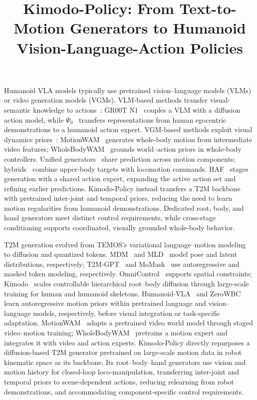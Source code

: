 \documentclass{article}
\title{Kimodo-Policy: From Text-to-Motion Generators to Humanoid Vision-Language-Action Policies}
\begin{document}
Humanoid VLA models typically use pretrained vision--language models (VLMs) or video generation models (VGMs).
VLM-based methods transfer visual-semantic knowledge to actions~\cite{grootn1,psi0,humanoidexo,openhlm}: GR00T N1~\cite{grootn1} couples a VLM with a diffusion action model, while $\Psi_0$~\cite{psi0} transfers representations from human egocentric demonstrations to a humanoid action expert.
VGM-based methods exploit visual dynamics priors~\cite{motionwam,wholebodywam_wbc}: MotionWAM~\cite{motionwam} generates whole-body motion from intermediate video features; WholeBodyWAM~\cite{wholebodywam_wbc} grounds world--action priors in whole-body controllers.
Unified generators~\cite{openhlm,motionwam} share prediction across motion components; hybrids~\cite{humanoidexo,wholebodyvla} combine upper-body targets with locomotion commands.
HAF~\cite{haf} stages generation with a shared action expert, expanding the active action set and refining earlier predictions.
Kimodo-Policy instead transfers a T2M backbone with pretrained inter-joint and temporal priors, reducing the need to learn motion regularities from humanoid demonstrations. Dedicated root, body, and hand generators meet distinct control requirements, while cross-stage conditioning supports coordinated, visually grounded whole-body behavior.
\par\bigskip
T2M generation evolved from TEMOS's variational language--motion modeling~\cite{temos} to diffusion and quantized tokens. MDM~\cite{mdm} and MLD~\cite{mld} model pose and latent distributions, respectively; T2M-GPT~\cite{t2mgpt} and MoMask~\cite{momask} use autoregressive and masked token modeling, respectively. OmniControl~\cite{omnicontrol} supports spatial constraints; Kimodo~\cite{kimodo} scales controllable hierarchical root--body diffusion through large-scale training for human and humanoid skeletons. Humanoid-VLA~\cite{humanoidvla} and ZeroWBC~\cite{zerowbc} learn autoregressive motion priors within pretrained language and vision--language models, respectively, before visual integration or task-specific adaptation. MotionWAM~\cite{motionwam} adapts a pretrained video world model through staged video--motion training; WholeBodyWAM~\cite{wholebodywam_motionpriors} pretrains a motion expert and integrates it with video and action experts. Kimodo-Policy directly repurposes a diffusion-based T2M generator pretrained on large-scale motion data in robot kinematic space as its backbone. Its root--body--hand generators use vision and motion history for closed-loop loco-manipulation, transferring inter-joint and temporal priors to scene-dependent actions, reducing relearning from robot demonstrations, and accommodating component-specific control requirements.
\end{document}
